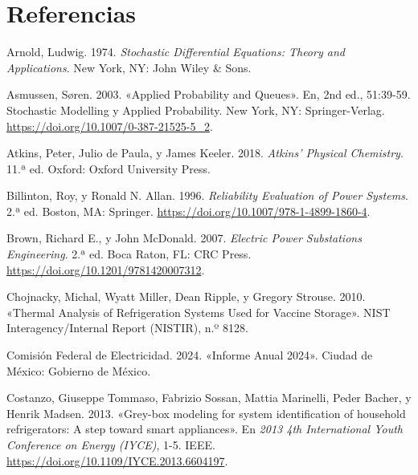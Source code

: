 \documentclass[
  spanish,
  us-letterpaper,
]{scrreprt}
\newlength{\cslhangindent}
\newenvironment{CSLReferences}[2] %
 {\begin{list}{}{%
  \setlength{\itemindent}{0pt}
  \setlength{\leftmargin}{0pt}
  \setlength{\parsep}{0pt}
  \ifodd #1
   \setlength{\leftmargin}{\cslhangindent}
   \setlength{\itemindent}{-1\cslhangindent}
  \fi
  \setlength{\itemsep}{#2\baselineskip}}}
 {\end{list}}
\numberwithin{equation}{section}
\theoremstyle{plain}
\theoremstyle{plain}
\theoremstyle{plain}
\theoremstyle{definition}
\theoremstyle{remark}
\begin{document}

\chapter*{Referencias}\label{referencias}


\label{refs}
\begin{CSLReferences}{1}{0}
Arnold, Ludwig. 1974. \emph{Stochastic Differential Equations: Theory
and Applications}. New York, NY: John Wiley \& Sons.

Asmussen, Søren. 2003. {«Applied Probability and Queues»}. En, 2nd ed.,
51:39-59. Stochastic Modelling y Applied Probability. New York, NY:
Springer-Verlag. \url{https://doi.org/10.1007/0-387-21525-5_2}.

Atkins, Peter, Julio de Paula, y James Keeler. 2018. \emph{Atkins'
Physical Chemistry}. 11.ª ed. Oxford: Oxford University Press.

Billinton, Roy, y Ronald N. Allan. 1996. \emph{Reliability Evaluation of
Power Systems}. 2.ª ed. Boston, MA: Springer.
\url{https://doi.org/10.1007/978-1-4899-1860-4}.

Brown, Richard E., y John McDonald. 2007. \emph{Electric Power
Substations Engineering}. 2.ª ed. Boca Raton, FL: CRC Press.
\url{https://doi.org/10.1201/9781420007312}.

Chojnacky, Michal, Wyatt Miller, Dean Ripple, y Gregory Strouse. 2010.
{«Thermal Analysis of Refrigeration Systems Used for Vaccine Storage»}.
NIST Interagency/Internal Report (NISTIR), n.º 8128.

Comisión Federal de Electricidad. 2024. {«Informe Anual 2024»}. Ciudad
de México: Gobierno de México.

Costanzo, Giuseppe Tommaso, Fabrizio Sossan, Mattia Marinelli, Peder
Bacher, y Henrik Madsen. 2013. {«Grey-box modeling for system
identification of household refrigerators: A step toward smart
appliances»}. En \emph{2013 4th International Youth Conference on Energy
(IYCE)}, 1-5. IEEE. \url{https://doi.org/10.1109/IYCE.2013.6604197}.


\end{CSLReferences}
\end{document}
